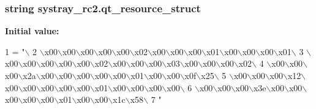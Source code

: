 \subsubsection[{qt\+\_\+resource\+\_\+struct}]{\setlength{\rightskip}{0pt plus 5cm}string systray\+\_\+rc2.\+qt\+\_\+resource\+\_\+struct}\label{namespacesystray__rc2_a5adb2d10a74353ba4c5777da348e1fdc}
{\bfseries Initial value\+:}
\begin{DoxyCode}
1 = \textcolor{stringliteral}{"\(\backslash\)}
2 \textcolor{stringliteral}{\(\backslash\)x00\(\backslash\)x00\(\backslash\)x00\(\backslash\)x00\(\backslash\)x00\(\backslash\)x02\(\backslash\)x00\(\backslash\)x00\(\backslash\)x00\(\backslash\)x01\(\backslash\)x00\(\backslash\)x00\(\backslash\)x00\(\backslash\)x01\(\backslash\)}
3 \textcolor{stringliteral}{\(\backslash\)x00\(\backslash\)x00\(\backslash\)x00\(\backslash\)x00\(\backslash\)x00\(\backslash\)x02\(\backslash\)x00\(\backslash\)x00\(\backslash\)x00\(\backslash\)x03\(\backslash\)x00\(\backslash\)x00\(\backslash\)x00\(\backslash\)x02\(\backslash\)}
4 \textcolor{stringliteral}{\(\backslash\)x00\(\backslash\)x00\(\backslash\)x00\(\backslash\)x2a\(\backslash\)x00\(\backslash\)x00\(\backslash\)x00\(\backslash\)x00\(\backslash\)x00\(\backslash\)x01\(\backslash\)x00\(\backslash\)x00\(\backslash\)x0f\(\backslash\)x25\(\backslash\)}
5 \textcolor{stringliteral}{\(\backslash\)x00\(\backslash\)x00\(\backslash\)x00\(\backslash\)x12\(\backslash\)x00\(\backslash\)x00\(\backslash\)x00\(\backslash\)x00\(\backslash\)x00\(\backslash\)x01\(\backslash\)x00\(\backslash\)x00\(\backslash\)x00\(\backslash\)x00\(\backslash\)}
6 \textcolor{stringliteral}{\(\backslash\)x00\(\backslash\)x00\(\backslash\)x00\(\backslash\)x3e\(\backslash\)x00\(\backslash\)x00\(\backslash\)x00\(\backslash\)x00\(\backslash\)x00\(\backslash\)x01\(\backslash\)x00\(\backslash\)x00\(\backslash\)x1c\(\backslash\)x58\(\backslash\)}
7 \textcolor{stringliteral}{"}
\end{DoxyCode}
